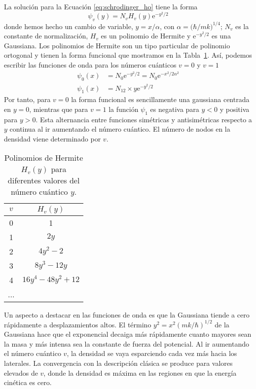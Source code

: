 \documentclass{tufte-handout}
\begin{document}
La solución para la Ecuación \ref{eq:schrodinger_ho} 
tiene la forma
\begin{equation}
    \psi_v(y)=N_vH_v(y)\mathrm{e}^{-y^2/2}
\end{equation}
donde hemos hecho un cambio de variable, $y=x/\alpha$, 
con $\alpha=\big(\hbar/mk\big)^{1/4}$; $N_v$ es
la constante de normalización, $H_v$ es un polinomio de
Hermite y $\mathrm{e}^{-y^2/2}$ es una Gaussiana. 
Los polinomios de Hermite  son un tipo particular de
polinomio ortogonal y tienen la forma funcional que
mostramos en la Tabla~\ref{tb:hermite}. Así, podemos
escribir las funciones de onda para los números
cuánticos $v=0$ y $v=1$ 
\begin{subequations}
    \begin{align}
        \psi_0(x)&=N_0\mathrm{e}^{-y^2/2}=N_0\mathrm{e}^{-x^2/2\alpha^2} \\
        \psi_1(x)&=N_12\times y\mathrm{e}^{-y^2/2}
    \end{align}
\end{subequations}
Por tanto, para $v=0$ la forma funcional es sencillamente
una gaussiana centrada en $y=0$, mientras que para $v=1$ 
la función $\psi_1$ es negativa para $y<0$ y positiva para
$y>0$. Esta alternancia  entre funciones simétricas y
antisimétricas respecto a $y$ continua al ir aumentando el
número cuántico. El número de nodos en la densidad viene
determinado por $v$.

\begin{table}[t!]
    \centering
    \begin{tabular}{c|c}
     $v$ & $H_v(y)$ \\
     \hline
    0 & 1\\ 
    1 & $2y$\\ 
    2 & $4y^2-2$\\ 
    3 & $8y^3-12y$\\ 
    4 & $16y^4 - 48y^2 + 12$\\
    ... & 
    \end{tabular}
    \caption{Polinomios de Hermite $H_v(y)$ para diferentes 
    valores del número cuántico $y$.}
    \label{tb:hermite}
\end{table}

Un aspecto a destacar en las funciones de onda es que la
Gaussiana tiende a cero rápidamente a desplazamientos altos.
El término  $y^2=x^2(mk/\hbar)^{1/2}$ de la Gaussiana hace
que el exponencial decaiga más rápidamente cuanto mayores
sean la masa y más intensa sea la constante de fuerza del
potencial. Al ir aumentando el número cuántico $v$, la
densidad se vaya esparciendo cada vez más hacia los
laterales. %
La convergencia con la descripción clásica se produce para
valores elevados de $v$, donde la densidad es máxima en las
regiones en que la energía cinética es cero.
\end{document}

